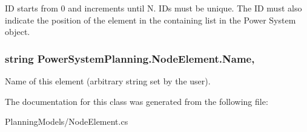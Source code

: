 ID starts from 0 and increments until N. ID\textquotesingle{}s must be unique. The ID must also indicate the position of the element in the containing list in the Power System object. 
\subsubsection[{\texorpdfstring{Name}{Name}}]{\setlength{\rightskip}{0pt plus 5cm}string Power\+System\+Planning.\+Node\+Element.\+Name\hspace{0.3cm}{\ttfamily [get]}, {\ttfamily [set]}}\hypertarget{class_power_system_planning_1_1_node_element_a07a0b254e0ac3b4b97dd45bde0a44291}{}\label{class_power_system_planning_1_1_node_element_a07a0b254e0ac3b4b97dd45bde0a44291}


Name of this element (arbitrary string set by the user). 



The documentation for this class was generated from the following file\+:\begin{DoxyCompactItemize}
\item 
Planning\+Models/Node\+Element.\+cs\end{DoxyCompactItemize}
